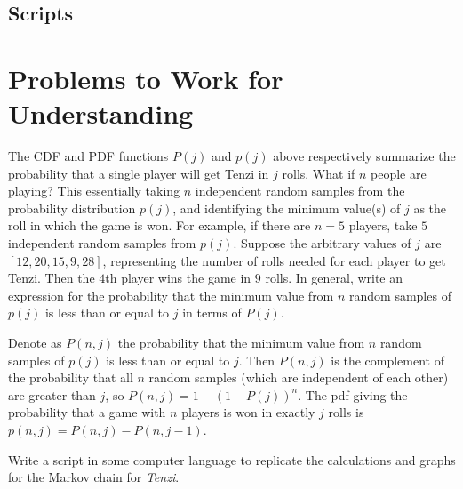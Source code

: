 \documentclass[12pt]{article}
\begin{document}
\subsection*{Scripts}



\hr

\section*{Problems to Work for Understanding}

\renewcommand{\theexerciseseries}{}
\renewcommand{\theexercise}{\arabic{exercise}}

\begin{exercise}
    The CDF and PDF functions \( P(j) \) and \( p(j) \) above
    respectively summarize the probability that a single player will get
    Tenzi in \( j \) rolls.  What if \( n \) people are playing?  This
    essentially taking \( n \) independent random samples from the
    probability distribution \( p(j) \), and identifying the minimum
    value(s) of \( j \) as the roll in which the game is won.  For
    example, if there are \( n=5 \) players, take \( 5 \) independent
    random samples from \( p(j) \).  Suppose the arbitrary values of \(
    j \) are \( [12,20,15,9,28] \), representing the number of rolls
    needed for each player to get Tenzi.  Then the \( 4 \)th player wins
    the game in \( 9 \) rolls.  In general, write an expression for the
    probability that the minimum value from \( n \) random samples of \(
    p(j) \) is less than or equal to \( j \) in terms of \( P(j) \).
\end{exercise}
\begin{solution}
    Denote as \( P(n,j) \) the probability that the minimum value from \(
    n \) random samples of \( p(j) \) is less than or equal to \( j \).
    Then \( P(n,j) \) is the complement of the probability that all \( n
    \) random samples (which are independent of each other) are greater
    than \( j \), so \( P(n,j)=1 - (1 - P(j))^n \).  The pdf giving the
    probability that a game with \( n \) players is won in exactly \( j \)
    rolls is \( p(n, j)=P(n,j) - P(n,j - 1) \).
\end{solution}
\begin{exercise}
    Write a script in some computer language to replicate the
    calculations and graphs for the Markov chain for \emph{Tenzi}.
\end{exercise}
\end{document}
